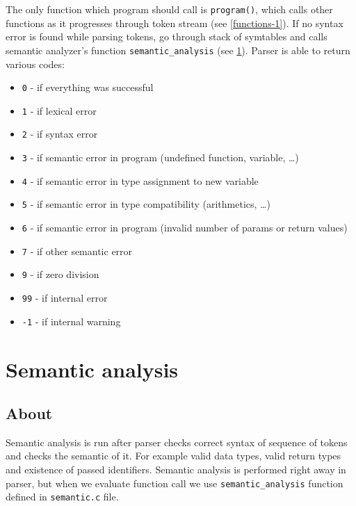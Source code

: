 \documentclass[11pt, titlepage]{article}
\begin{document}
The only function which program should call is \texttt{program()}, which
calls other functions as it progresses through
token stream (see \ref{functions-1}). If no syntax error is
found while parsing tokens, go through stack of
symtables and calls semantic analyzer's function \texttt{semantic\_analysis} (see \ref{semantic-analysis}). Parser is
able to return various codes:

\begin{itemize}[itemsep=-5pt]
\item
  \texttt{0} - if everything was successful
\item
  \texttt{1} - if lexical error
\item
  \texttt{2} - if syntax error
\item
  \texttt{3} - if semantic error in program (undefined function,
  variable, \ldots)
\item
  \texttt{4} - if semantic error in type assignment to new variable
\item
  \texttt{5} - if semantic error in type compatibility (arithmetics,
  \ldots)
\item
  \texttt{6} - if semantic error in program (invalid number of params or
  return values)
\item
  \texttt{7} - if other semantic error
\item
  \texttt{9} - if zero division
\item
  \texttt{99} - if internal error
\item
  \texttt{-1} - if internal warning
\end{itemize}



\section{Semantic analysis}\label{semantic-analysis}

\subsection{About}\label{about-2}

Semantic analysis is run after parser checks correct
syntax of sequence of tokens and checks the semantic of it. For example
valid data types, valid return types and existence of passed
identifiers. Semantic analysis is performed right away in parser, but when we evaluate function call we use \texttt{semantic\_analysis} function defined in \texttt{semantic.c} file.
\end{document}
